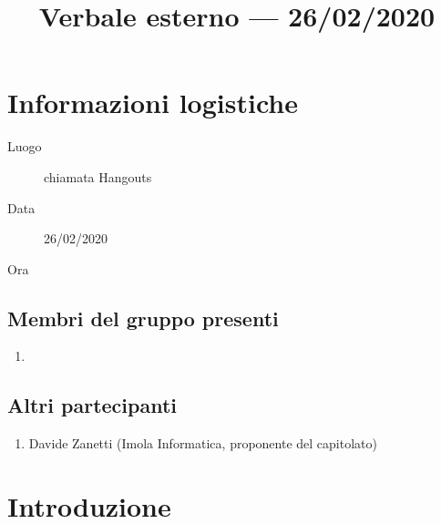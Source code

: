 \documentclass{article}
\title{Verbale esterno --- 26/02/2020}
\begin{document}


\section{Informazioni logistiche}%
\label{sec:informazioni_logistiche}

\begin{description}
  \item [Luogo] chiamata Hangouts
  \item [Data] 26/02/2020
  \item [Ora]   
\end{description}

\subsection{Membri del gruppo presenti}%
\label{sub:membri_del_gruppo_presenti}

\begin{enumerate}
  \item {}
\end{enumerate}

\subsection{Altri partecipanti}%
\label{sub:altri_partecipanti}

\begin{enumerate}
  \item Davide Zanetti (Imola Informatica, proponente del capitolato)
\end{enumerate}


\section{Introduzione}%
\label{sec:introduzione}
\end{document}
